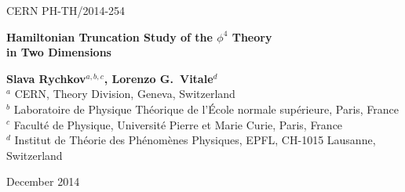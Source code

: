 \documentclass[11pt]{article}
\numberwithin{equation}{section}
\begin{document}
\vspace*{-.6in} \thispagestyle{empty}
\begin{flushright}
CERN PH-TH/2014-254\\
\end{flushright}
\vspace{1cm} {\Large
\begin{center}
{\bf Hamiltonian Truncation Study of the $\phi^4$ Theory\\ in Two Dimensions}\\
\end{center}}
\vspace{1cm}
\begin{center}
{\bf Slava Rychkov$^{a,b,c}$,  Lorenzo G.~Vitale$^d$}\\[2cm] 
{
$^{a}$ CERN, Theory Division, Geneva, Switzerland\\
$^{b}$ Laboratoire de Physique Th\'{e}orique de l'\'{E}cole normale sup\'{e}rieure, Paris, France\\
$^{c}$ Facult\'{e} de Physique, Universit\'{e} Pierre et Marie Curie, Paris, France\\
$^d$ Institut de Th\'eorie des Ph\'enom\`enes Physiques, EPFL, CH-1015 Lausanne, Switzerland\\
}
\vspace{1cm}%
\end{center}

\vspace{4mm}

\begin{abstract}
We defend the Fock-space Hamiltonian truncation method, which allows to calculate numerically the spectrum of strongly coupled quantum field theories, by putting them in a finite volume and imposing a UV cutoff. The accuracy of the method is improved via an analytic renormalization procedure inspired by the usual effective field theory. As an application, we study the two-dimensional $\phi^4$ theory for a wide range of couplings. The theory exhibits a quantum phase transition between the symmetry-preserving and symmetry-breaking phases. We extract quantitative predictions for the spectrum and the critical coupling and make contact with previous results from the literature. Future directions to further improve the accuracy of the method and enlarge its scope of applications are outlined.
 \end{abstract}
\vspace{.2in}
\vspace{.3in}
\hspace{0.7cm} December 2014
\end{document}
